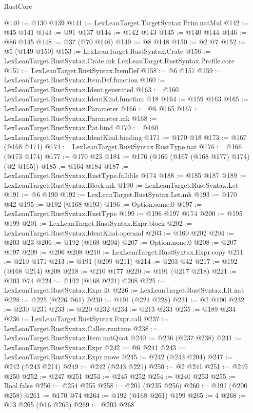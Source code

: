 \begin{lexlean}{RustCore}
\begin{coremodule}
@140 := @130 @139
@141 := LexLeanTarget.TargetSyntax.Prim.natMul
@142 := @45 @141
@143 := @91 @137
@144 := @142 @143
@145 := @140 @144
@146 := @86 @145
@148 := @37 (@70 @146)
@149 := @8 @148
@150 := @2 @7
@152 := @5 (@149 @150)
@153 := LexLeanTarget.RustSyntax.Crate
@156 := LexLeanTarget.RustSyntax.Crate.mk LexLeanTarget.RustSyntax.Profile.core
@157 := LexLeanTarget.RustSyntax.ItemDef
@158 := @6 @157
@159 := LexLeanTarget.RustSyntax.ItemDef.function
@160 := LexLeanTarget.RustSyntax.Ident.generated
@163 := @160 LexLeanTarget.RustSyntax.IdentKind.function @18
@164 := @159 @163
@165 := LexLeanTarget.RustSyntax.Parameter
@166 := @6 @165
@167 := LexLeanTarget.RustSyntax.Parameter.mk
@168 := LexLeanTarget.RustSyntax.Pat.bind
@170 := @160 LexLeanTarget.RustSyntax.IdentKind.binding
@171 := @170 @18
@173 := @167 (@168 @171)
@174 := LexLeanTarget.RustSyntax.RustType.nat
@176 := @166 (@173 @174)
@177 := @170 @23
@184 := @176 (@166 (@167 (@168 @177) @174) (@2 @165))
@185 := @164 @184
@187 := LexLeanTarget.RustSyntax.RustType.fallible @174
@188 := @185 @187
@189 := LexLeanTarget.RustSyntax.Block.mk
@190 := LexLeanTarget.RustSyntax.Let
@191 := @6 @190
@192 := LexLeanTarget.RustSyntax.Let.mk
@193 := @170 @42
@195 := @192 (@168 @193)
@196 := Option.some.{0}
@197 := LexLeanTarget.RustSyntax.RustType
@199 := @196 @197 @174
@200 := @195 @199
@201 := LexLeanTarget.RustSyntax.Expr.block
@202 := LexLeanTarget.RustSyntax.IdentKind.operand
@203 := @160 @202
@204 := @203 @23
@206 := @192 (@168 @204)
@207 := Option.none.{0}
@208 := @207 @197
@209 := @206 @208
@210 := LexLeanTarget.RustSyntax.Expr.copy
@211 := @210 @171
@213 := @191 (@209 @211)
@214 := @203 @42
@217 := @192 (@168 @214) @208
@218 := @210 @177
@220 := @191 (@217 @218)
@221 := @203 @74
@224 := @192 (@168 @221) @208
@225 := LexLeanTarget.RustSyntax.Expr.lit
@226 := LexLeanTarget.RustSyntax.Lit.nat
@228 := @225 (@226 @61)
@230 := @191 (@224 @228)
@231 := @2 @190
@232 := @230 @231
@233 := @220 @232
@234 := @213 @233
@235 := @189 @234
@236 := LexLeanTarget.RustSyntax.Expr.call
@237 := LexLeanTarget.RustSyntax.Callee.runtime
@238 := LexLeanTarget.RustSyntax.Item.natQuot
@240 := @236 (@237 @238)
@241 := LexLeanTarget.RustSyntax.Expr
@242 := @6 @241
@243 := LexLeanTarget.RustSyntax.Expr.move
@245 := @242 (@243 @204)
@247 := @242 (@243 @214)
@249 := @242 (@243 @221)
@250 := @2 @241
@251 := @249 @250
@252 := @247 @251
@253 := @245 @252
@254 := @240 @253
@255 := Bool.false
@256 := @254 @255
@258 := @201 (@235 @256)
@260 := @191 (@200 @258)
@261 := @170 @74
@264 := @192 (@168 @261) @199
@265 := 4
@268 := @13 @265 (@16 @265)
@269 := @203 @268

\end{coremodule}
\end{lexlean}
